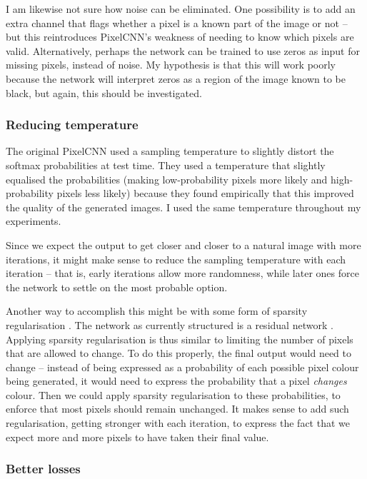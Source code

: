 \documentclass[11pt, a4paper, openany]{book}
\begin{document}
I am likewise not sure how noise can be eliminated. One possibility is to add an extra channel that flags whether a pixel is a known part of the image or not -- but this reintroduces PixelCNN's weakness of needing to know which pixels are valid. Alternatively, perhaps the network can be trained to use zeros as input for missing pixels, instead of noise. My hypothesis is that this will work poorly because the network will interpret zeros as a region of the image known to be black, but again, this should be investigated.

\subsubsection{Reducing temperature} \label{temperature}

The original PixelCNN used a sampling temperature \citep{pixelcnn2} to slightly distort the softmax probabilities at test time. They used a temperature that slightly equalised the probabilities (making low-probability pixels more likely and high-probability pixels less likely) because they found empirically that this improved the quality of the generated images. I used the same temperature throughout my experiments.

Since we expect the output to get closer and closer to a natural image with more iterations, it might make sense to reduce the sampling temperature with each iteration -- that is, early iterations allow more randomness, while later ones force the network to settle on the most probable option.

Another way to accomplish this might be with some form of sparsity regularisation \citep{sparse1,sparse2}. The network as currently structured is a residual network \citep{resnet}. Applying sparsity regularisation is thus similar to limiting the number of pixels that are allowed to change. To do this properly, the final output would need to change -- instead of being expressed as a probability of each possible pixel colour being generated, it would need to express the probability that a pixel \emph{changes} colour. Then we could apply sparsity regularisation to these probabilities, to enforce that most pixels should remain unchanged. It makes sense to add such regularisation, getting stronger with each iteration, to express the fact that we expect more and more pixels to have taken their final value.

\subsubsection{Better losses}
\end{document}
